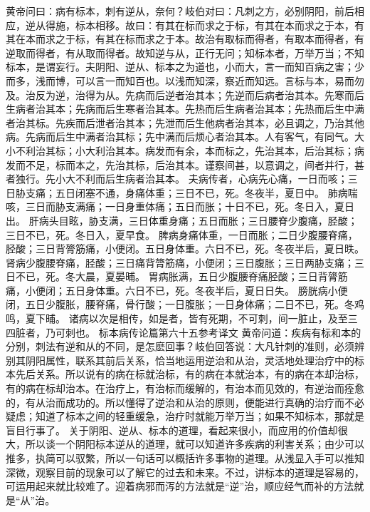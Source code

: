 \documentclass[a4paper,12pt,UTF8,twoside]{ctexbook}
\begin{document}
黄帝问曰：病有标本，刺有逆从，奈何？岐伯对曰：凡刺之方，必别阴阳，前后相应，逆从得施，标本相移。故曰：有其在标而求之于标，有其在本而求之于本，有其在本而求之于标，有其在标而求之于本。故治有取标而得者，有取本而得者，有逆取而得者，有从取而得者。故知逆与从，正行无问；知标本者，万举万当；不知标本，是谓妄行。夫阴阳、逆从、标本之为道也，小而大，言一而知百病之害；少而多，浅而博，可以言一而知百也。以浅而知深，察近而知远。言标与本，易而勿及。治反为逆，治得为从。先病而后逆者治其本；先逆而后病者治其本。先寒而后生病者治其本；先病而后生寒者治其本。先热而后生病者治其本；先热而后生中满者治其标。先疾而后泄者治其本；先泄而后生他病者治其本，必且调之，乃治其他病。先病而后生中满者治其标；先中满而后烦心者治其本。人有客气，有同气。大小不利治其标；小大利治其本。病发而有余，本而标之，先治其本，后治其标；病发而不足，标而本之，先治其标，后治其本。谨察间甚，以意调之，间者并行，甚者独行。先小大不利而后生病者治其本。
夫病传者，心病先心痛，一日而咳；三日胁支痛；五日闭塞不通，身痛体重；三日不已，死。冬夜半，夏日中。
肺病喘咳，三日而胁支满痛；一日身重体痛；五日而胀；十日不已，死。冬日入，夏日出。
肝病头目眩，胁支满，三日体重身痛；五日而胀；三日腰脊少腹痛，胫酸；三日不已，死。冬日入，夏早食。
脾病身痛体重，一日而胀；二日少腹腰脊痛，胫酸；三日背膂筋痛，小便闭。五日身体重。六日不已，死。冬夜半后，夏日昳。
肾病少腹腰脊痛，胫酸；三日痛背膂筋痛，小便闭；三日腹胀；三日两胁支痛；三日不已，死。冬大晨，夏晏晡。
胃病胀满，五日少腹腰脊痛胫酸；三日背膂筋痛，小便闭；五日身体重。六日不已，死。冬夜半后，夏日日失。
膀胱病小便闭，五日少腹胀，腰脊痛，骨行酸；一日腹胀；一日身体痛；二日不已，死。冬鸡鸣，夏下晡。
诸病以次是相传，如是者，皆有死期，不可刺，间一脏止，及至三四脏者，乃可刺也。
标本病传论篇第六十五参考译文
黄帝问道：疾病有标和本的分别，刺法有逆和从的不同，是怎麽回事？岐伯回答说：大凡针刺的准则，必须辨别其阴阳属性，联系其前后关系，恰当地运用逆治和从治，灵活地处理治疗中的标本先后关系。所以说有的病在标就治标，有的病在本就治本，有的病在本却治标，有的病在标却治本。在治疗上，有治标而缓解的，有治本而见效的，有逆治而痊愈的，有从治而成功的。所以懂得了逆治和从治的原则，便能进行真确的治疗而不必疑虑；知道了标本之间的轻重缓急，治疗时就能万举万当；如果不知标本，那就是盲目行事了。
关于阴阳、逆从、标本的道理，看起来很小，而应用的价值却很大，所以谈一个阴阳标本逆从的道理，就可以知道许多疾病的利害关系；由少可以推多，执简可以驭繁，所以一句话可以概括许多事物的道理。从浅显入手可以推知深微，观察目前的现象可以了解它的过去和未来。不过，讲标本的道理是容易的，可运用起来就比较难了。迎着病邪而泻的方法就是“逆”治，顺应经气而补的方法就是“从”治。
\end{document}
